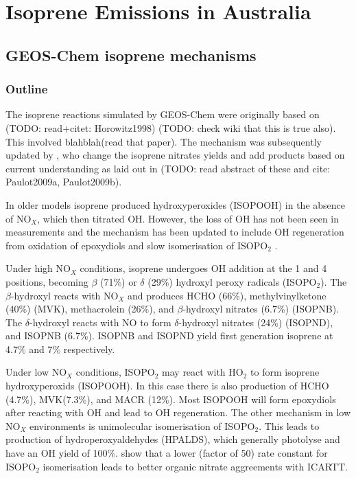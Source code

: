 
\chapter{Isoprene Emissions in Australia} %
\label{ch_isop}

\section{GEOS-Chem isoprene mechanisms}
\label{ch_isop:sec:GEOSChemMechanisms}
  \subsection{Outline}
    The isoprene reactions simulated by GEOS-Chem were originally based on (TODO: read+citet: Horowitz1998) (TODO: check wiki that this is true also).
    This involved blahblah(read that paper).
    The mechanism was subsequently updated by \citet{Mao2013}, who change the isoprene nitrates yields and add products based on current understanding as laid out in (TODO: read abstract of these and cite: Paulot2009a, Paulot2009b).

    In older models isoprene produced hydroxyperoxides (ISOPOOH) in the absence of NO$_X$, which then titrated OH.
    However, the loss of OH has not been seen in measurements and the mechanism has been updated to include OH regeneration from oxidation of epoxydiols and slow isomerisation of ISOPO$_2$ \citep{Mao2013}.
    
    Under high NO$_X$ conditions, isoprene undergoes OH addition at the 1 and 4 positions, becoming $\beta$ (71\%) or $\delta$ (29\%) hydroxyl peroxy radicals (ISOPO$_2$). 
    The $\beta$-hydroxyl reacts with NO$_X$ and produces HCHO (66\%), methylvinylketone (40\%) (MVK), methacrolein (26\%), and $\beta$-hydroxyl nitrates (6.7\%) (ISOPNB).
    The $\delta$-hydroxyl reacts with NO to form $\delta$-hydroxyl nitrates (24\%) (ISOPND), and ISOPNB (6.7\%).
    ISOPNB and ISOPND yield first generation isoprene at 4.7\% and 7\% respectively.
    
    Under low NO$_X$ conditions, ISOPO$_2$ may react with HO$_2$ to form isoprene hydroxyperoxids (ISOPOOH).
    In this case there is also production of HCHO (4.7\%), MVK(7.3\%), and MACR (12\%).
    Most ISOPOOH will form epoxydiols after reacting with OH and lead to OH regeneration.
    The other mechanism in low NO$_X$ environments is unimolecular isomerisation of ISOPO$_2$.
    This leads to production of hydroperoxyaldehydes (HPALDS), which generally photolyse and have an OH yield of 100\%.
    \citet{Mao2013} show that a lower (factor of 50) rate constant for ISOPO$_2$ isomerisation leads to better organic nitrate aggreements with ICARTT. 
    
